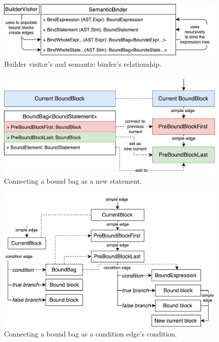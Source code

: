\begin{figure}[h]
	\centering	
	\includegraphics[scale=0.75]{../img/5_3_BoundWholeExpression}	
	\caption{Builder visitor's and semantic binder's relationship.}
	\label{fig5.3:BindWholeExpr}
\end{figure}

\begin{figure}[h]
	\centering	
	\includegraphics[scale=0.75]{../img/5_3_newStatement}	
	\caption{Connecting a bound bag as a new statement.}
	\label{fig5.3:BindNewStm}
\end{figure}

\begin{figure}[h]
	\centering	
	\includegraphics[scale=0.70]{../img/5_3_newInIfEdge}	
	\caption{Connecting a bound bag as a condition edge's condition.}
	\label{fig5.3:BindIfEdge}
\end{figure}

